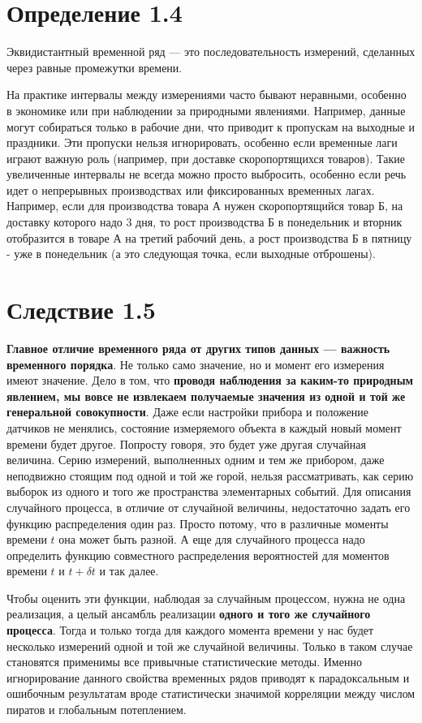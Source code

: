\section*{Определение 1.4}
Эквидистантный временной ряд — это последовательность измерений,
сделанных через равные промежутки времени.

На практике интервалы между измерениями часто бывают неравными, особенно в
экономике или при наблюдении за природными явлениями. Например,
данные могут собираться только в рабочие дни, что приводит к
пропускам на выходные и праздники. Эти пропуски нельзя
игнорировать, особенно если временные лаги играют важную роль
(например, при доставке скоропортящихся товаров).
Такие увеличенные интервалы не всегда можно просто выбросить, особенно
если речь идет о непрерывных производствах или фиксированных временных лагах.
Например, если для производства товара А нужен скоропортящийся
товар Б, на доставку которого надо 3 дня, то рост производства Б в
понедельник и вторник отобразится в товаре А на третий рабочий
день, а рост производства Б в пятницу - уже в понедельник (а это
следующая точка, если выходные отброшены).

\section*{Следствие 1.5}
\textbf{Главное отличие временного ряда от других типов данных — важность
временного порядка}. Не только само значение, но и момент его
измерения имеют значение. Дело в том, что \textbf{проводя наблюдения за
  каким-то природным явлением, мы вовсе не
  извлекаем получаемые значения из одной и той же генеральной
совокупности}. Даже если
настройки прибора и положение датчиков не менялись, состояние
измеряемого объекта в каждый новый момент времени будет другое.
Попросту говоря, это будет уже другая случайная величина. Серию
измерений, выполненных одним и тем же прибором, даже неподвижно
стоящим под одной и той же горой, нельзя рассматривать, как серию
выборок из одного и того же пространства элементарных событий. Для
описания случайного процесса, в отличие от случайной величины,
недостаточно задать его функцию
распределения один раз. Просто потому, что в различные моменты времени
$t$ она может быть разной. А еще для случайного процесса надо
определить функцию совместного распределения вероятностей для
моментов времени $t$ и $t+\delta t$ и так далее.

Чтобы оценить эти функции, наблюдая за случайным процессом, нужна не
одна реализация, а целый
ансамбль реализации \textbf{одного и того же случайного процесса}. Тогда
и только тогда для каждого момента времени у нас будет несколько
измерений одной и той же случайной величины. Только в таком случае
становятся применимы все привычные статистические методы. Именно
игнорирование данного свойства временных рядов приводят к
парадоксальным и ошибочным результатам вроде статистически значимой корреляции
между числом пиратов и глобальным потеплением.

